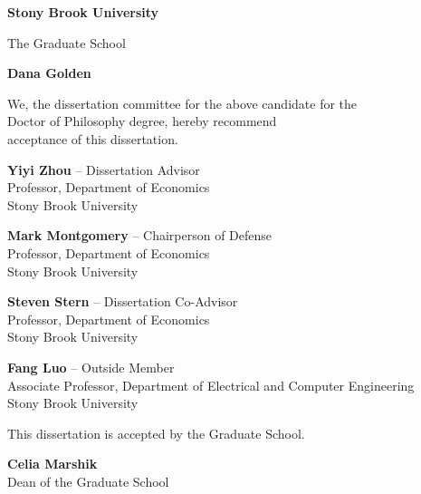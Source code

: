 \clearpage
\begin{singlespace}
\begin{center}

{\large\bfseries Stony Brook University}

\vspace{0.1in}

The Graduate School

\vspace{0.3in}

{\large\bfseries Dana Golden}

\vspace{0.3in}

We, the dissertation committee for the above candidate for the\\
Doctor of Philosophy degree, hereby recommend\\
acceptance of this dissertation.

\vspace{0.4in}

\textbf{Yiyi Zhou} -- Dissertation Advisor\\
Professor, Department of Economics\\
Stony Brook University

\vspace{0.25in}

\textbf{Mark Montgomery} -- Chairperson of Defense\\
Professor, Department of Economics\\
Stony Brook University

\vspace{0.25in}

\textbf{Steven Stern} -- Dissertation Co-Advisor\\
Professor, Department of Economics\\
Stony Brook University

\vspace{0.25in}

\textbf{Fang Luo} -- Outside Member\\
Associate Professor, Department of Electrical and Computer Engineering\\
Stony Brook University

\vspace{0.4in}

This dissertation is accepted by the Graduate School.

\vspace{0.3in}

\textbf{Celia Marshik}\\
Dean of the Graduate School

\end{center}
\end{singlespace}
